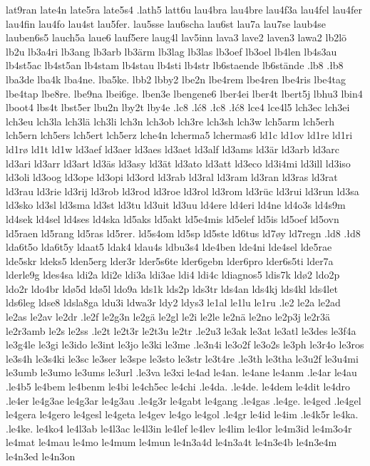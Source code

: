 {{lat9ran
late4n
late5ra
late5s4
.lath5
latt6u
lau4bra
lau4bre
lau4f3a
lau4fel
lau4fer
lau4fin
lau4fo
lau4st
lau5fer.
lau5sse
lau6scha
lau6st
lau7a
lau7se
laub4se
lauben6s5
lauch5a
laue6
lauf5ere
laug4l
lav5inn
lava3
lave2
laven3
lawa2
lb2lö
lb2u
lb3a4ri
lb3ang
lb3arb
lb3ärm
lb3lag
lb3las
lb3oef
lb3oel
lb4len
lb4s3au
lb4st5ac
lb4st5an
lb4stam
lb4stau
lb4sti
lb4str
lb6staende
lb6stände
.lb8
.łb8
lba3de
lba4k
lba4ne.
lba5ke.
lbb2
lbby2
lbe2n
lbe4rem
lbe4ren
lbe4ris
lbe4tag
lbe4tap
lbe8re.
lbe9na
lbei6ge.
lben3e
lbengene6
lber4ei
lber4t
lbert5j
lbhu3
lbin4
lboot4
lbs4t
lbst5er
lbu2n
lby2t
lby4e
.lc8
.lć8
.łc8
.łć8
lce4
lce4l5
lch3ec
lch3ei
lch3eu
lch3la
lch3lä
lch3li
lch3n
lch3ob
lch3re
lch3sh
lch3w
lch5arm
lch5erh
lch5ern
lch5ers
lch5ert
lch5erz
lche4n
lcherma5
lchermas6
ld1c
ld1ov
ld1re
ld1ri
ld1rø
ld1t
ld1w
ld3aef
ld3aer
ld3aes
ld3aet
ld3alf
ld3ams
ld3är
ld3arb
ld3arc
ld3ari
ld3arr
ld3art
ld3äs
ld3asy
ld3ät
ld3ato
ld3att
ld3eco
ld3i4mi
ld3ill
ld3iso
ld3oli
ld3oog
ld3ope
ld3opi
ld3ord
ld3rab
ld3ral
ld3ram
ld3ran
ld3ras
ld3rat
ld3rau
ld3rie
ld3rij
ld3rob
ld3rod
ld3roe
ld3rol
ld3rom
ld3rüc
ld3rui
ld3run
ld3sa
ld3sko
ld3sl
ld3sma
ld3st
ld3tu
ld3uit
ld3uu
ld4ere
ld4eri
ld4ne
ld4o3s
ld4s9m
ld4sek
ld4sel
ld4ses
ld4ska
ld5aks
ld5akt
ld5e4mis
ld5elef
ld5is
ld5oef
ld5ovn
ld5raen
ld5rang
ld5ras
ld5rer.
ld5s4om
ld5sp
ld5ste
ld6tus
ld7øy
ld7regn
.ld8
.łd8
lda6t5o
lda6t5y
ldaat5
ldak4
ldau4s
ldbu3s4
lde4ben
lde4ni
lde4sel
lde5rae
lde5skr
ldeks5
lden5erg
lder3r
lder5s6te
lder6gebn
lder6pro
lder6s5ti
lder7a
lderle9g
ldes4sa
ldi2a
ldi2e
ldi3a
ldi3ae
ldi4
ldi4c
ldiagnos5
ldis7k
ldø2
ldo2p
ldo2r
ldo4br
ldø5d
ldø5l
ldo9a
lds1k
lds2p
lds3tr
lds4an
lds4kj
lds4kl
lds4let
lds6leg
ldse8
ldsla8ga
ldu3i
ldwa3r
ldy2
ldys3
le1al
le1lu
le1ru
.le2
le2a
le2ad
le2as
le2av
le2dr
.le2f
le2g3n
le2gä
le2gl
le2i
le2le
le2nä
le2no
le2p3j
le2r3ä
le2r3amb
le2s
le2ss
.le2t
le2t3r
le2t3u
le2tr
.le2u3
le3ak
le3at
le3atl
le3des
le3f4a
le3g4le
le3gi
le3ido
le3int
le3jo
le3ki
le3me
.le3n4i
le3o2f
le3o2s
le3ph
le3r4o
le3ros
le3s4h
le3s4ki
le3sc
le3ser
le3spe
le3sto
le3str
le3t4re
.le3th
le3tha
le3u2f
le3u4mi
le3umb
le3umo
le3ums
le3url
.le3va
le3xi
le4ad
le4an.
le4ane
le4anm
.le4ar
le4au
.le4b5
le4bem
le4benm
le4bi
le4ch5ec
le4chi
.le4da.
.le4de.
le4dem
le4dit
le4dro
.le4er
le4g3ae
le4g3ar
le4g3au
.le4g3r
le4gabt
le4gang
.le4gas
.le4ge.
le4ged
.le4gel
le4gera
le4gero
le4gesl
le4geta
le4gev
le4go
le4gol
.le4gr
le4id
le4im
.le4k5r
le4ka.
.le4ke.
le4ko4
le4l3ab
le4l3ac
le4l3in
le4lef
le4lev
le4lim
le4lor
le4m3id
le4m3o4r
le4mat
le4mau
le4mo
le4mum
le4mun
le4n3a4d
le4n3a4t
le4n3e4b
le4n3e4m
le4n3ed
le4n3on
}}
